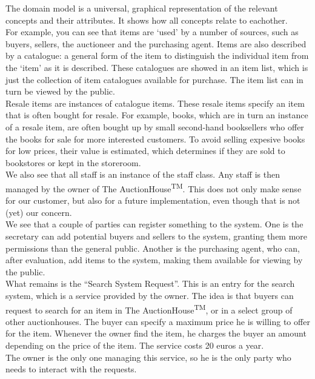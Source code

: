 The domain model is a universal, graphical representation of the relevant concepts and their attributes. It shows how all concepts relate to eachother.\\
For example, you can see that items are `used' by a number of sources, such as buyers, sellers, the auctioneer and the purchasing agent. Items are also described by a catalogue: a general form of the item to distinguish the individual item from the `item' as it is described. These catalogues are showed in an item list, which is just the collection of item catalogues available for purchase. The item list can in turn be viewed by the public.\\
Resale items are instances of catalogue items. These resale items specify an item that is often bought for resale. For example, books, which are in turn an instance of a resale item, are often bought up by small second-hand booksellers who offer the books for sale for more interested customers. To avoid selling expesive books for low prices, their value is estimated, which determines if they are sold to bookstores or kept in the storeroom.\\
We also see that all staff is an instance of the staff class. Any staff is then managed by the owner of The AuctionHouse\textsuperscript{TM}. This does not only make sense for our customer, but also for a future implementation, even though that is not (yet) our concern.\\
We see that a couple of parties can register something to the system. One is the secretary can add potential buyers and sellers to the system, granting them more permissions than the general public. Another is the purchasing agent, who can, after evaluation, add items to the system, making them available for viewing by the public.\\
What remains is the ``Search System Request''. This is an entry for the search system, which is a service provided by the owner. The idea is that buyers can request to search for an item in The AuctionHouse\textsuperscript{TM}, or in a select group of other auctionhouses. The buyer can specify a maximum price he is willing to offer for the item. Whenever the owner find the item, he charges the buyer an amount depending on the price of the item. The service costs 20 euros a year.\\
The owner is the only one managing this service, so he is the only party who needs to interact with the requests.